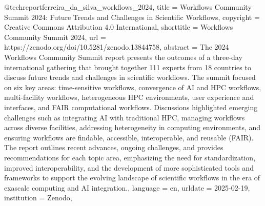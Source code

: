 @techreport{ferreira_da_silva_workflows_2024,
	title = {Workflows {Community} {Summit} 2024: {Future} {Trends} and {Challenges} in {Scientific} {Workflows}},
	copyright = {Creative Commons Attribution 4.0 International},
	shorttitle = {Workflows {Community} {Summit} 2024},
	url = {https://zenodo.org/doi/10.5281/zenodo.13844758},
	abstract = {The 2024 Workflows Community Summit report presents the outcomes of a three-day international gathering that brought together 111 experts from 18 countries to discuss future trends and challenges in scientific workflows. The summit focused on six key areas: time-sensitive workflows, convergence of AI and HPC workflows, multi-facility workflows, heterogeneous HPC environments, user experience and interfaces, and FAIR computational workflows. Discussions highlighted emerging challenges such as integrating AI with traditional HPC, managing workflows across diverse facilities, addressing heterogeneity in computing environments, and ensuring workflows are findable, accessible, interoperable, and reusable (FAIR). The report outlines recent advances, ongoing challenges, and provides recommendations for each topic area, emphasizing the need for standardization, improved interoperability, and the development of more sophisticated tools and frameworks to support the evolving landscape of scientific workflows in the era of exascale computing and AI integration.},
	language = {en},
	urldate = {2025-02-19},
	institution = {Zenodo},
}
